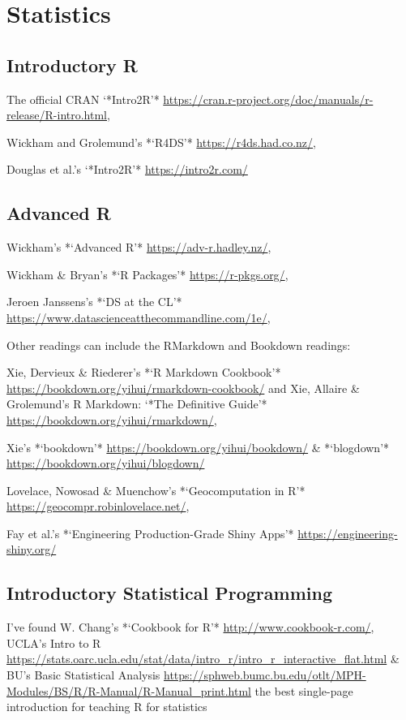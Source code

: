 \documentclass[
]{book}
\begin{document}
\chapter{Statistics}\label{statistics}

\section{Introductory R}\label{introductory-r}

The official CRAN `*Intro2R'* \url{https://cran.r-project.org/doc/manuals/r-release/R-intro.html},

Wickham and Grolemund's *`R4DS'* \url{https://r4ds.had.co.nz/},

Douglas et al.'s `*Intro2R'* \url{https://intro2r.com/}

\section{Advanced R}\label{advanced-r}

Wickham's *`Advanced R'* \url{https://adv-r.hadley.nz/},

Wickham \& Bryan's *`R Packages'* \url{https://r-pkgs.org/},

Jeroen Janssens's *`DS at the CL'* \url{https://www.datascienceatthecommandline.com/1e/},

Other readings can include the RMarkdown and Bookdown readings:

Xie, Dervieux \& Riederer's *`R Markdown Cookbook'* \url{https://bookdown.org/yihui/rmarkdown-cookbook/} and Xie, Allaire \& Grolemund's R Markdown: `*The Definitive Guide'* \url{https://bookdown.org/yihui/rmarkdown/},

Xie's *`bookdown'* \url{https://bookdown.org/yihui/bookdown/} \& *`blogdown'* \url{https://bookdown.org/yihui/blogdown/}

Lovelace, Nowosad \& Muenchow's *`Geocomputation in R'* \url{https://geocompr.robinlovelace.net/},

Fay et al.'s *`Engineering Production-Grade Shiny Apps'* \url{https://engineering-shiny.org/}

\section{Introductory Statistical Programming}\label{introductory-statistical-programming}

I've found W. Chang's *`Cookbook for R'* \url{http://www.cookbook-r.com/}, UCLA's Intro to R \url{https://stats.oarc.ucla.edu/stat/data/intro_r/intro_r_interactive_flat.html} \& BU's Basic Statistical Analysis \url{https://sphweb.bumc.bu.edu/otlt/MPH-Modules/BS/R/R-Manual/R-Manual_print.html} the best single-page introduction for teaching R for statistics
\end{document}
